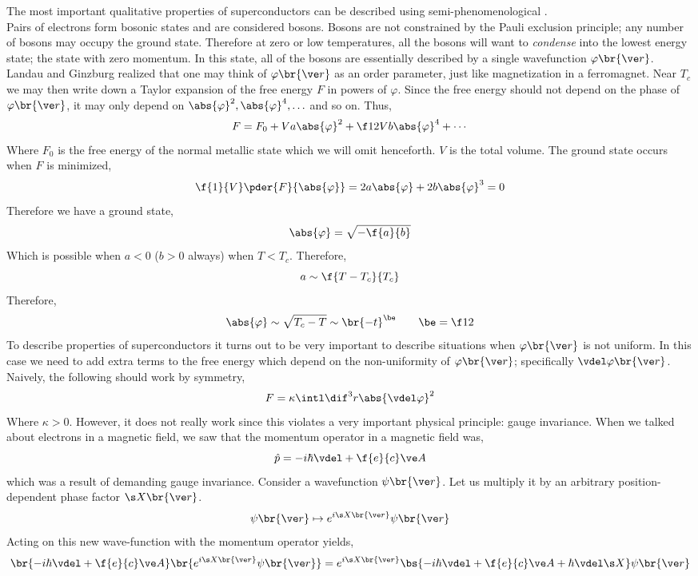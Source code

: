 \documentclass{article}
\newcommand{\vp}{\varphi}
\begin{document}
The most important qualitative properties of superconductors can be described using semi-phenomenological .\\

Pairs of electrons form bosonic states and are considered bosons. Bosons are not constrained by the Pauli exclusion principle; any number of bosons may occupy the ground state. Therefore at zero or low temperatures, all the bosons will want to \textit{condense} into the lowest energy state; the state with zero momentum. In this state, all of the bosons are essentially described by a single wavefunction $\vp\br{\ve r}$. Landau and Ginzburg realized that one may think of $\vp\br{\ve r}$ as an order parameter, just like magnetization in a ferromagnet. Near $T_c$ we may then write down a Taylor expansion of the free energy $F$ in powers of $\vp$. Since the free energy should not depend on the phase of $\vp\br{\ve r}$, it may only depend on $\abs{\vp}^2, \abs{\vp}^4, \ldots$ and so on. Thus,
\[ F = F_0 + V a \abs{\vp}^2 + \f12 V b \abs{\vp}^4 + \cdots \]
Where $F_0$ is the free energy of the normal metallic state which we will omit henceforth. $V$ is the total volume. The ground state occurs when $F$ is minimized,
\[ \f{1}{V} \pder{F}{\abs{\vp}} = 2 a \abs{\vp} + 2 b \abs{\vp}^3 = 0 \]
Therefore we have a ground state,
\[ \abs{\vp} = \sqrt{- \f{a}{b}} \]
Which is possible when $a < 0$ ($b > 0$ always) when $T < T_c$. Therefore,
\[ a \sim \f{T - T_c}{T_c} \]
Therefore,
\[ \abs{\vp} \sim \sqrt{T_c - T} \sim \br{-t}^{\be} \qquad \be = \f12 \]
To describe properties of superconductors it turns out to be very important to describe situations when $\vp\br{\ve r}$ is not uniform. In this case we need to add extra terms to the free energy which depend on the non-uniformity of $\vp\br{\ve r}$; specifically $\vdel \vp\br{\ve r}$. Naively, the following should work by symmetry,
\[ F = \kappa \intl \dif^3 r \abs{\vdel \vp}^2 \]
Where $\kappa > 0$. However, it does not really work since this violates a very important physical principle: {gauge invariance}. When we talked about electrons in a magnetic field, we saw that the momentum operator in a magnetic field was,
\[ \hat p = - i \hbar \vdel  + \f{e}{c} \ve A \]
which was a result of demanding gauge invariance. Consider a wavefunction $\psi\br{\ve r}$. Let us multiply it by an arbitrary position-dependent phase factor $\s X\br{\ve r}$.
\[ \psi\br{\ve r} \mapsto e^{i \s X \br{\ve r}}\psi\br{\ve r} \]
Acting on this new wave-function with the momentum operator yields,
\[ \br{- i \hbar \vdel  + \f{e}{c} \ve A} \br{e^{i \s X \br{\ve r}}\psi\br{\ve r}} = e^{i \s X \br{\ve r}} \bs{- i \hbar \vdel  + \f{e}{c} \ve A + \hbar \vdel \s X} \psi\br{\ve r} \]
\end{document}
